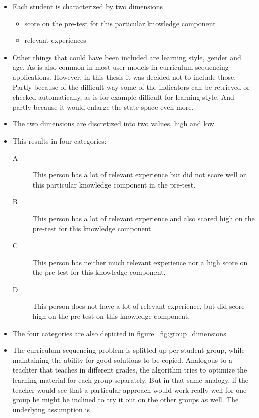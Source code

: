 \begin{itemize}
	\item Each student is characterized by two dimensions
		\begin{itemize}
			\item score on the pre-test for this particular knowledge component
			\item relevant experiences
		\end{itemize}
	\item Other things that could have been included are learning
		style, gender and age. As is also common in most user models in
		curriculum sequencing applications. However, in this thesis it
		was decided not to include those. Partly because of the
		difficult way some of the indicators can be retrieved or
		checked automatically, as is for example difficult for learning
		style. And partly because it would enlarge the state space even
		more.
	\item The two dimensions are discretized into two values, high and low.
	\item This results in four categories:
		\begin{description}
			\item[A] This person has a lot of relevant experience but did not
				score well on this particular knowledge component in the
				pre-test.
			\item[B] This person has a lot of relevant experience and also
				scored high on the pre-test for this knowledge component.
			\item[C] This person has neither much relevant experience nor
				a high score on the pre-test for this knowledge component.
			\item[D] This person does not have a lot of relevant experience,
				but did score high on the pre-test on this knowledge component.
		\end{description}
	\item The four categories are also depicted in figure~\ref{fig:group_dimensions}.
	\item The curriculum sequencing problem is splitted up per student group,
		while maintaining the ability for good solutions to be copied.
		Analogous to a teachter that teaches in different grades, the algorithm
		tries to optimize the learning material for each group separately. But
		in that same analogy, if the teacher would see that a particular
		approach would work really well for one group he might be inclined to
		try it out on the other groups as well. The underlying assumption is

\end{itemize}
